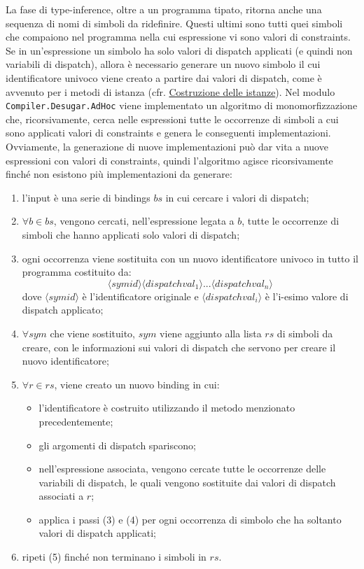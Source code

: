 \documentclass[10pt,a4paper]{article}
\begin{document}
La fase di type-inference, oltre a un programma tipato, ritorna anche una sequenza di nomi di simboli da ridefinire.
Questi ultimi sono tutti quei simboli che compaiono nel programma nella cui espressione vi sono valori di constraints.
Se in un'espressione un simbolo ha solo valori di dispatch applicati (e quindi non variabili di dispatch), allora è necessario
generare un nuovo simbolo il cui identificatore univoco viene creato a partire dai valori di dispatch, come è avvenuto
per i metodi di istanza (cfr. \hyperlink{Costruzione delle istanze}{Costruzione delle istanze}).
Nel modulo \texttt{Compiler.Desugar.AdHoc} viene implementato un algoritmo di monomorfizzazione che, ricorsivamente,
cerca nelle espressioni tutte le occorrenze di simboli a cui sono applicati valori di constraints e
genera le conseguenti implementazioni.
Ovviamente, la generazione di nuove implementazioni può dar vita a nuove espressioni con valori di constraints,
quindi l'algoritmo agisce ricorsivamente finché non esistono più implementazioni da generare:
\begin{enumerate}
    \item l'input è una serie di bindings $ bs $ in cui cercare i valori di dispatch;
    \item $ \forall b \in bs $, vengono cercati, nell'espressione legata a $ b $, tutte le occorrenze di simboli che
    hanno applicati solo valori di dispatch;
    \item ogni occorrenza viene sostituita con un nuovo identificatore univoco in tutto il programma costituito da:
        \[\langle symid \rangle \langle dispatchval_1 \rangle ... \langle dispatchval_n \rangle \]
    dove $ \langle symid \rangle $ è l'identificatore originale e $ \langle dispatchval_i \rangle $ è l'i-esimo valore di
    dispatch applicato;
    \item $ \forall sym $ che viene sostituito, $ sym $ viene aggiunto alla lista $ rs $ di simboli da creare, con le
    informazioni sui valori di dispatch che servono per creare il nuovo identificatore;
    \item $ \forall r \in rs $, viene creato un nuovo binding in cui:
    \begin{itemize}
        \item l'identificatore è costruito utilizzando il metodo menzionato precedentemente;
        \item gli argomenti di dispatch spariscono;
        \item nell'espressione associata, vengono cercate tutte le occorrenze delle variabili di dispatch, le quali
        vengono sostituite dai valori di dispatch associati a $ r $;
        \item applica i passi (3) e (4) per ogni occorrenza di simbolo che ha soltanto valori di dispatch applicati;
    \end{itemize}
    \item ripeti (5) finché non terminano i simboli in $ rs $.
\end{enumerate}
\end{document}
